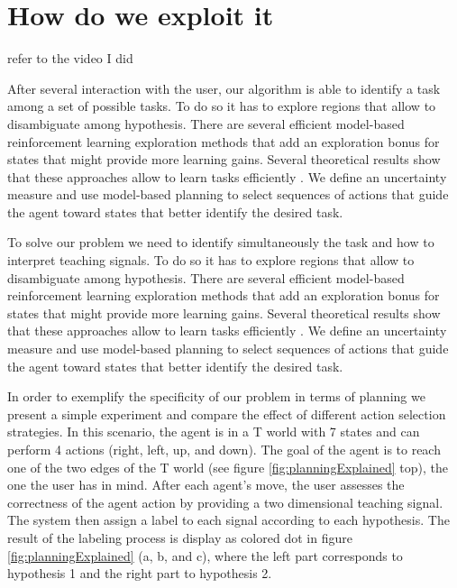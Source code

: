 \section{How do we exploit it}

refer to the video I did

After several interaction with the user, our algorithm is able to identify a task among a set of possible tasks. To do so it has to explore regions that allow to disambiguate among hypothesis. There are several efficient model-based reinforcement learning exploration methods that add an exploration bonus for states that might provide more learning gains. Several theoretical results show that these approaches allow to learn tasks efficiently \cite{brafman2003r,kolter2009near}. We define an uncertainty measure and use model-based planning to select sequences of actions that guide the agent toward states that better identify the desired task.

To solve our problem we need to identify simultaneously the task and how to interpret teaching signals. To do so it has to explore regions that allow to disambiguate among hypothesis. There are several efficient model-based reinforcement learning exploration methods that add an exploration bonus for states that might provide more learning gains. Several theoretical results show that these approaches allow to learn tasks efficiently \cite{brafman2003r,kolter2009near}. We define an uncertainty measure and use model-based planning to select sequences of actions that guide the agent toward states that better identify the desired task.

In order to exemplify the specificity of our problem in terms of planning we present a simple experiment and compare the effect of different action selection strategies. In this scenario, the agent is in a T world with 7 states and can perform 4 actions (right, left, up, and down). The goal of the agent is to reach one of the two edges of the T world (see figure \ref{fig:planningExplained} top), the one the user has in mind. After each agent's move, the user assesses the correctness of the agent action by providing a two dimensional teaching signal. The system then assign a label to each signal according to each hypothesis. The result of the labeling process is display as colored dot in figure \ref{fig:planningExplained} (a, b, and c), where the left part corresponds to hypothesis 1 and the right part to hypothesis 2.


